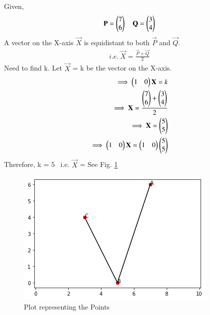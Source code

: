 Given,
\begin{align}
\mathbf{P} = \begin{pmatrix}7\\6\end{pmatrix} \quad
\mathbf{Q} = \begin{pmatrix}3\\4\end{pmatrix}    
\end{align}
A vector on  the  X-axis  $\vec{X}$  is  equidistant  to  both  $\vec{P}$  and $\vec{Q}$.
\begin{align}
i.e. \ \vec{X} = \frac{{\vec{P}+\vec{Q}}}{2}    
\end{align}
Need to find  k. 
Let $\vec{X}$ = k  be  the  vector  on  the  X-axis.
\begin{align}
\implies \begin{pmatrix}1 & 0\end{pmatrix}\mathbf{X} = k \\
\implies \mathbf{X} = \frac{\begin{pmatrix}7\\6\end{pmatrix}+\begin{pmatrix}3\\4\end{pmatrix}}{2} \\
\implies \mathbf{X} = \begin{pmatrix}5\\5\end{pmatrix} \\
\implies \begin{pmatrix}1 & 0\end{pmatrix}\mathbf{X} = \begin{pmatrix}1 & 0\end{pmatrix}\begin{pmatrix}5\\5\end{pmatrix} \\ 
\end{align}
Therefore, k = 5 \ i.e. $\vec{X}$ = 
See Fig.     \ref{Fig.1solutions/point_vector/22/}

\begin{figure}[!htb]
    \centering
    \includegraphics[width=\columnwidth]{./solutions/point_vector/22/Assignment1.png}
    \caption{Plot representing the Points}
    \label{Fig.1solutions/point_vector/22/}
\end{figure}

